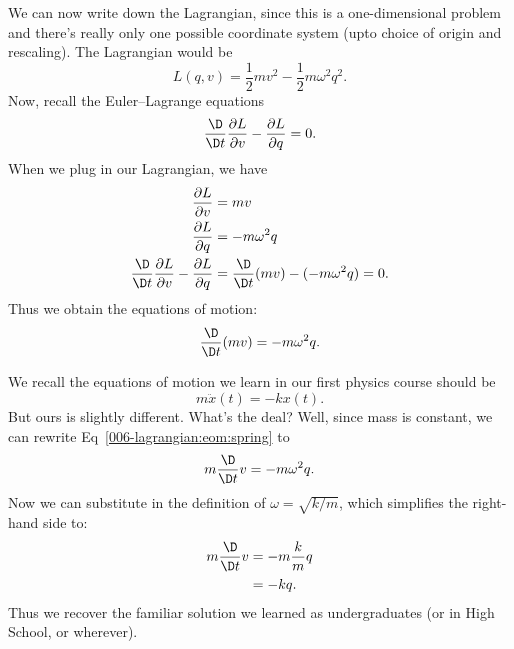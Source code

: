 We can now write down the Lagrangian, since this is a one-dimensional
problem and there's really only one possible coordinate system (upto
choice of origin and rescaling). The Lagrangian would be
\begin{equation}
L(q,v) = \frac{1}{2}mv^{2} - \frac{1}{2}m\omega^{2}q^{2}.
\end{equation}
Now, recall the Euler--Lagrange equations
\begin{equation}
\frac{\D}{\D t}\frac{\partial L}{\partial v} - \frac{\partial L}{\partial q} = 0.
\end{equation}
When we plug in our Lagrangian, we have
\begin{subequations}
\begin{align}
\frac{\partial L}{\partial v} &= mv\\
\frac{\partial L}{\partial q} &= -m\omega^{2}q\\
\frac{\D}{\D t}\frac{\partial L}{\partial v} - \frac{\partial L}{\partial q} 
&=\frac{\D}{\D t}(mv) - (-m\omega^{2}q) = 0.
\end{align}
\end{subequations}
Thus we obtain the equations of motion:
\begin{equation}\label{006-lagrangian:eom:spring}
\frac{\D}{\D t}(mv) = -m\omega^{2}q.
\end{equation}

We recall the equations of motion we learn in our first physics course
should be
\begin{equation}
m\ddot{x}(t) = -kx(t).
\end{equation}
But ours is slightly different. What's the deal? Well, since mass is
constant, we can rewrite Eq~\eqref{006-lagrangian:eom:spring} to
\begin{equation}
m\frac{\D}{\D t}v = - m\omega^{2}q.
\end{equation}
Now we can substitute in the definition of $\omega=\sqrt{k/m}$, which
simplifies the right-hand side to:
\begin{equation}
\begin{split}
m\frac{\D}{\D t}v &= - m\frac{k}{m}q\\
&= -kq.
\end{split}
\end{equation}
Thus we recover the familiar solution we learned as undergraduates (or
in High School, or wherever).

